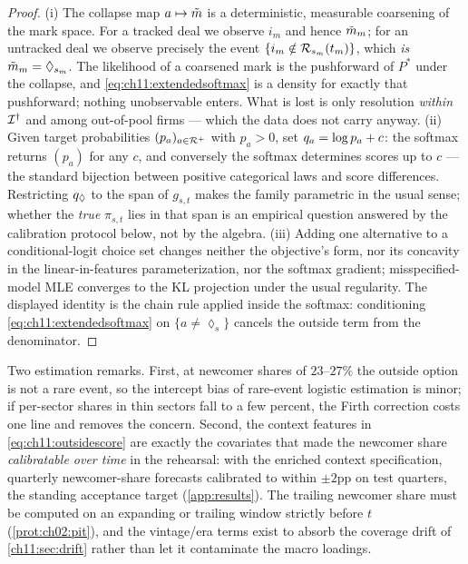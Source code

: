 \begin{proof}
(i) The collapse map $a \mapsto \tilde{m}$ is a deterministic,
measurable coarsening of the mark space. For a tracked deal we observe
$i_m$ and hence $\tilde{m}_m$; for an untracked deal we observe
precisely the event $\{i_m \notin \mathcal{R}_{s_m}(t_m)\}$, which \emph{is}
$\tilde{m}_m = \lozenge_{s_m}$. The likelihood of a coarsened mark is
the pushforward of $P^*$ under the collapse, and
\cref{eq:ch11:extendedsoftmax} is a density for exactly that pushforward;
nothing unobservable enters. What is lost is only resolution
\emph{within} $\mathcal{I}^{\dagger}$ and among out-of-pool firms --- which
the data does not carry anyway.
(ii) Given target probabilities $(p_a)_{a \in \mathcal{R}^+}$ with
$p_a > 0$, set $q_a = \log p_a + c$: the softmax returns $(p_a)$
for any $c$, and conversely the softmax determines scores up to $c$
--- the standard bijection between positive categorical laws and score
differences. Restricting $q_{\lozenge}$ to the span of $g_{s,t}$
makes the family parametric in the usual sense; whether the \emph{true}
$\pi_{s,t}$ lies in that span is an empirical question answered by the
calibration protocol below, not by the algebra.
(iii) Adding one alternative to a conditional-logit choice set changes
neither the objective's form, nor its concavity in the linear-in-features
parameterization, nor the softmax gradient; misspecified-model MLE
converges to the KL projection under the usual regularity. The displayed
identity is the chain rule applied inside the softmax:
conditioning \cref{eq:ch11:extendedsoftmax} on $\{a \ne \lozenge_s\}$
cancels the outside term from the denominator.
\end{proof}

Two estimation remarks. First, at newcomer shares of $23$--$27\%$ the
outside option is not a rare event, so the intercept bias of rare-event
logistic estimation \citep{kingzeng2001} is minor; if per-sector shares
in thin sectors fall to a few percent, the Firth correction
\citep{firth1993} costs one line and removes the concern. Second, the
context features in \cref{eq:ch11:outsidescore} are exactly the
covariates that made the newcomer share \emph{calibratable over time} in
the rehearsal: with the enriched context specification, quarterly
newcomer-share forecasts calibrated to within $\pm 2$pp on test
quarters, the standing acceptance target (\cref{app:results}). The trailing newcomer share
must be computed on an expanding or trailing window strictly before $t$
(\cref{prot:ch02:pit}), and the vintage/era terms exist to absorb the
coverage drift of \cref{ch11:sec:drift} rather than let it contaminate
the macro loadings.

